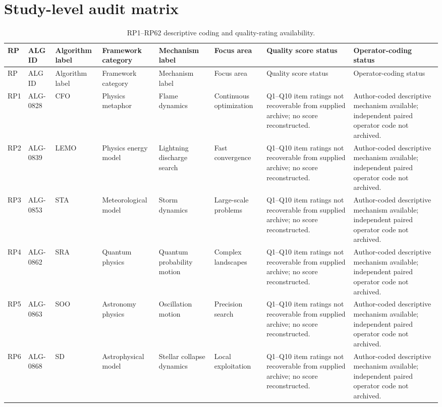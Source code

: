\documentclass[8pt]{article}
\begin{document}
\section*{Study-level audit matrix}
\begin{landscape}\scriptsize
\begin{longtable}{P{1.0cm}P{1.5cm}P{2.0cm}P{4.0cm}P{4.2cm}P{4.0cm}P{4.0cm}P{3.0cm}}
\caption{RP1--RP62 descriptive coding and quality-rating availability.}\\
\toprule
RP & ALG ID & Algorithm label & Framework category & Mechanism label & Focus area & Quality score status & Operator-coding status\\
\midrule\endfirsthead
\toprule RP & ALG ID & Algorithm label & Framework category & Mechanism label & Focus area & Quality score status & Operator-coding status\\\midrule\endhead
RP1 & ALG-0828 & CFO & Physics metaphor & Flame dynamics & Continuous optimization & Q1--Q10 item ratings not recoverable from supplied archive; no score reconstructed. & Author-coded descriptive mechanism available; independent paired operator code not archived. \\
RP2 & ALG-0839 & LEMO & Physics energy model & Lightning discharge search & Fast convergence & Q1--Q10 item ratings not recoverable from supplied archive; no score reconstructed. & Author-coded descriptive mechanism available; independent paired operator code not archived. \\
RP3 & ALG-0853 & STA & Meteorological model & Storm dynamics & Large-scale problems & Q1--Q10 item ratings not recoverable from supplied archive; no score reconstructed. & Author-coded descriptive mechanism available; independent paired operator code not archived. \\
RP4 & ALG-0862 & SRA & Quantum physics & Quantum probability motion & Complex landscapes & Q1--Q10 item ratings not recoverable from supplied archive; no score reconstructed. & Author-coded descriptive mechanism available; independent paired operator code not archived. \\
RP5 & ALG-0863 & SOO & Astronomy physics & Oscillation motion & Precision search & Q1--Q10 item ratings not recoverable from supplied archive; no score reconstructed. & Author-coded descriptive mechanism available; independent paired operator code not archived. \\
RP6 & ALG-0868 & SD & Astrophysical model & Stellar collapse dynamics & Local exploitation & Q1--Q10 item ratings not recoverable from supplied archive; no score reconstructed. & Author-coded descriptive mechanism available; independent paired operator code not archived. \\

\end{longtable}
\end{landscape}
\end{document}
